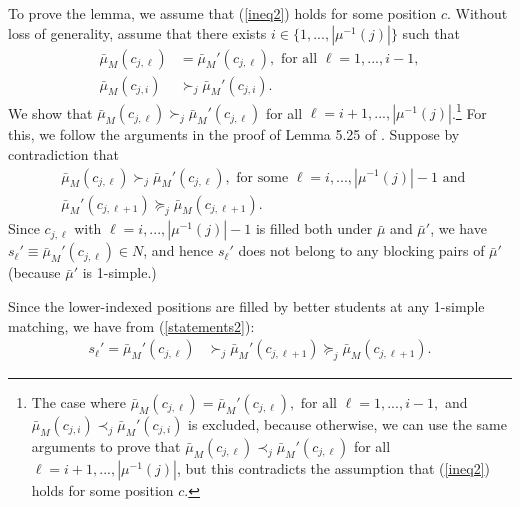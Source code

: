 \documentclass[12pt, fullpage]{amsart}
\theoremstyle{definition}
\theoremstyle{definition}
\theoremstyle{definition}
\begin{document}
\begin{bibunit}[econometrica]
To prove the lemma, we assume that (\ref{ineq2}) holds for some position $c$. Without loss of generality, assume that there exists $i \in \{1,...,|\mu^{-1}(j)|\}$ such that
\begin{align*}
	\bar{\mu}_{M}(c_{j,\ell}) &= \bar{\mu}_{M}'(c_{j,\ell}), \text{ for all } \ell = 1,...,i-1,\\
	\bar{\mu}_{M}(c_{j,i}) &\succ_j \bar{\mu}_{M}'(c_{j,i}).
\end{align*}
We show that $\bar{\mu}_{M}(c_{j,\ell})\succ_{j}\bar{\mu}_{M}'(c_{j,\ell})$ for all $\ell=i+1,...,|\mu^{-1}(j)|$.\footnote{The case where $\bar{\mu}_{M}(c_{j,\ell}) = \bar{\mu}_{M}'(c_{j,\ell}), \text{ for all } \ell = 1,...,i-1,$ and $\bar{\mu}_{M}(c_{j,i}) \prec_j \bar{\mu}_{M}'(c_{j,i})$ is excluded, because otherwise, we can use the same arguments to prove that $\bar{\mu}_{M}(c_{j,\ell})\prec_{j}\bar{\mu}_{M}'(c_{j,\ell})$ for all $\ell=i+1,...,|\mu^{-1}(j)|$, but this contradicts the assumption that (\ref{ineq2}) holds for some position $c$.} For this, we follow the arguments in the proof of Lemma 5.25 of \cite{Roth/Sotomayor:90:TwoSidedMatching}. Suppose by contradiction that
\begin{align}
	\label{statements1}
	&\bar{\mu}_{M}(c_{j,\ell})\succ_{j}\bar{\mu}_{M}'(c_{j,\ell}), \text{ for some } \ell=i,...,|\mu^{-1}(j)|-1 \text{ and }\\ \label{statements2}
	&\bar{\mu}_{M}'(c_{j,\ell+1})\succeq_{j}\bar{\mu}_{M}(c_{j,\ell+1}).
\end{align}
Since $c_{j,\ell}$ with $\ell=i,...,|\mu^{-1}(j)|-1$ is filled both under $\bar \mu$ and $\bar \mu'$, we have $s_{\ell}'\equiv\bar{\mu}_{M}'(c_{j,\ell}) \in N$, and hence $s_{\ell}'$ does not belong to any blocking pairs of $\bar{\mu}'$ (because $\bar{\mu}'$ is 1-simple.) 

Since the lower-indexed positions are filled by better students at any 1-simple matching, we have from (\ref{statements2}):
\begin{align}
	\label{eq2}
	s_{\ell}'=\bar{\mu}_{M}'(c_{j,\ell}) & \succ_{j}\bar{\mu}_{M}'(c_{j,\ell+1})\succeq_{j}\bar{\mu}_{M}(c_{j,\ell+1}).
\end{align}


\end{bibunit}
\end{document}
